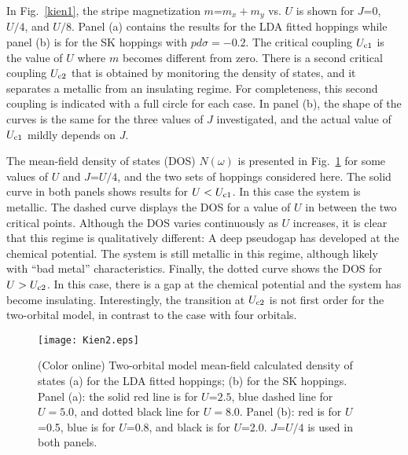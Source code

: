 \documentclass[aps,prb,superscriptaddress,preprintnumbers,
showpacs,legalpaper,twoside,twocolumn,amsmath,amssymb]{revtex4}
\begin{document}
In Fig.~\ref{kien1}, the stripe magnetization $m$=$m_x+m_y$ vs. $U$ is shown
for $J$=$0$, $U/4$, and $U/8$. Panel (a) contains the results for the LDA
fitted
hoppings\cite{scalapino} while panel (b) is for the SK hoppings\cite{daghofer} with
$pd\sigma=-0.2$. The critical coupling $U_{\rm c1}$ is the value of $U$ where
$m$ becomes different from zero. There is a second critical coupling
$U_{\rm c2}$ that is obtained by monitoring the density of states, and it separates a metallic from an
insulating regime. For completeness, this second coupling  is indicated with a full circle for each case.
In panel (b), the shape of the curves  is the same for the three values of $J$ investigated, and the actual
value of $U_{\rm c1}$ mildly depends on $J$.


The mean-field density of states (DOS) $N(\omega)$
is presented in Fig.~\ref{kien2} for some values of $U$ and $J$=$U/4$, and the
two sets of hoppings considered here.
The solid curve in both panels
shows results for $U<U_{\rm c1}$. In this case the system is metallic.
The dashed curve displays the DOS
for a value of $U$  in between the two critical points. Although the DOS varies continuously as $U$ increases,
it is clear that this regime is qualitatively different: A deep
pseudogap has developed at the chemical potential.
The system is still metallic in this regime, although
likely with ``bad metal'' characteristics.
Finally, the dotted curve shows the DOS for $U>U_{\rm c2}$. In this
case, there is a gap at the
chemical potential and the system has become
insulating. Interestingly, the transition at $U_{\rm c2}$ is not
first order for the two-orbital model, in contrast to the case with
four orbitals.

\begin{figure}
\centerline{\texttt{[image: Kien2.eps]}}
\vskip -0.5cm
\caption{(Color online) Two-orbital model mean-field calculated density of states
(a) for the LDA fitted hoppings;\cite{scalapino} (b) for the
SK hoppings.\cite{daghofer} Panel (a): the solid red line is for
$U$=$2.5$, blue dashed line for $U=5.0$, and dotted
black line for $U=8.0$. Panel (b): red is for $U$=0.5,
blue is for $U$=0.8, and black is for $U$=2.0.
$J$=$U/4$ is used in both panels.}
\label{kien2}
\end{figure}
\end{document}
